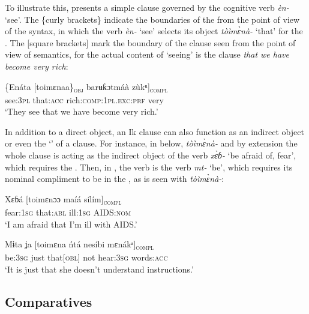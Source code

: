 To illustrate this,  presents a simple  clause governed by the cognitive verb \textit{èn-} ‘see’. The \{curly brackets\} indicate the boundaries of the  from the point of view of the syntax, in which the verb \textit{èn-} ‘see’ selects its object \textit{tòìm\`{ɛ}nà-} ‘that’ for the . The [square brackets] mark the boundary of the  clause seen from the point of view of semantics, for the actual content of ‘seeing’ is the clause \textit{that we have become very rich}:




\ea\label{ex:syn:54}
\gll \{Enáta  [toimɛnaa\}\textsc{\textsubscript{obj}} barʉƙɔt{\Í}máà   zùkᵘ]\textsc{\textsubscript{compl}} \\
see:\textsc{3pl}   that:\textsc{acc}    rich:\textsc{comp:1pl.exc:prf}   very    \\
\glt ‘They see that we have become very rich.’ 
\z


In addition to a direct object, an Ik  clause can also function as an indirect object or even the ‘’ of a  clause. For instance, in  below, \textit{tòìm\`{ɛ}nà-} and by extension the whole  clause is acting as the indirect object of the verb \textit{x\`{ɛ}ɓ-} ‘be afraid of, fear’, which requires the . Then, in , the verb is the  verb \textit{m{\Ì}t-} ‘be’, which requires its nominal compliment to be in the , as is seen with \textit{tòìm\`{ɛ}nà-}:



\ea\label{ex:syn:55}
\gll Xɛɓ{\Í}á     [toimɛnɔɔ   maíá     sílím]\textsc{\textsubscript{compl}} \\
fear:\textsc{1sg}   that:\textsc{abl}   ill:\textsc{1sg}   AIDS:\textsc{nom}    \\
\glt ‘I am afraid that I’m ill with AIDS.’ 
\z




\ea\label{ex:syn:56}
\gll Mɨta ʝa   [toimɛna   ńtá   nesíbi       mɛnákᵃ]\textsc{\textsubscript{compl}} \\
be:\textsc{3sg} just   that[\textsc{obl}]   not   hear:\textsc{3sg} words:\textsc{acc}    \\
\glt ‘It is just that she doesn’t understand instructions.’ 
\z






\subsection{Comparatives}\label{sec:10.7}


